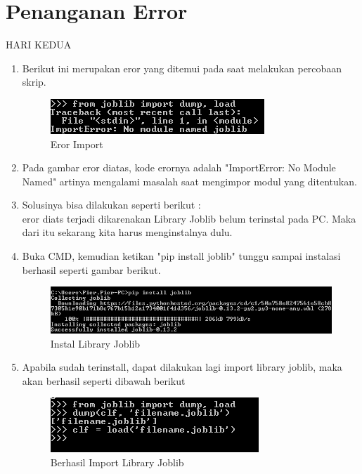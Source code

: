 \section{Penanganan Error}
HARI KEDUA
\begin{enumerate}
	\item
	Berikut ini merupakan eror yang ditemui pada saat melakukan percobaan skrip.
\begin{figure}
	\begin{center}
   	 \includegraphics[scale=1]{figures/eror2.png}
   	 \caption{Eror Import}
	\end{center}
\end{figure}
	\item
Pada gambar eror diatas, kode erornya adalah "ImportError: No Module Named" artinya mengalami masalah saat mengimpor modul yang ditentukan.
	\item
Solusinya bisa dilakukan seperti berikut :\\
eror diats terjadi dikarenakan Library Joblib belum terinstal pada PC. Maka dari itu sekarang kita harus menginstalnya dulu.
	\item
Buka CMD, kemudian ketikan "pip install joblib" tunggu sampai instalasi berhasil seperti gambar berikut.
\begin{figure}
	\begin{center}
   	 \includegraphics[scale=1]{figures/solusi2.png}
   	 \caption{Instal Library Joblib}
	\end{center}
\end{figure}
	\item
Apabila sudah terinstall, dapat dilakukan lagi import library joblib, maka akan berhasil seperti dibawah berikut
\begin{figure}
	\begin{center}
   	 \includegraphics[scale=1]{figures/solusi2_1.png}
   	 \caption{Berhasil Import Library Joblib}
	\end{center}
\end{figure}
\end{enumerate}

